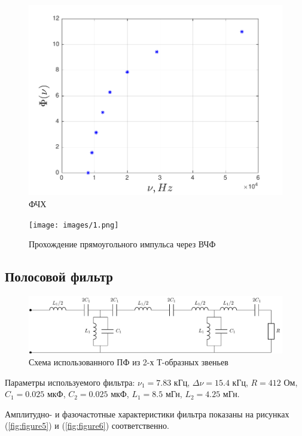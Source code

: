 \begin{figure}[h!]
	\centering
	\includegraphics[scale=0.9]{graph/graph4}
	\caption{ФЧХ}
	\label{fig:figure4}
\end{figure}

\begin{figure}[H]
	\centering
	\texttt{[image: images/1.png]}
	\caption{Прохождение прямоугольного импульса через ВЧФ}
	\label{fig:ris1}
\end{figure}

\subsection{Полосовой фильтр}
\begin{figure}[H]
	\centering
	\includegraphics[scale=1]{chem/chem4}
	\caption{ Схема использованного ПФ из 2-х Т-образных звеньев}
	\label{fig:chem4}
\end{figure}
Параметры используемого фильтра: $\nu_1=7.83$ кГц, $\Delta\nu=15.4$ кГц, $R=412$ Ом, $C_1=0.025$ мкФ,
$C_2=0.025$ мкФ, $L_1=8.5$ мГн, $L_2=4.25$ мГн. 

Амплитудно- и фазочастотные характеристики фильтра показаны на рисунках (\ref{fig:figure5}) и (\ref{fig:figure6}) соответственно.

